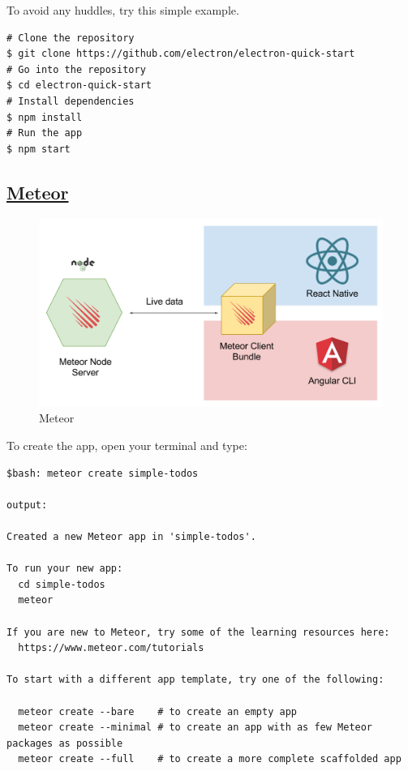 \documentclass[10pt, a4paper, twocolumn]{article}
\begin{document}
To avoid any huddles, try this simple example.

\begin{lstlisting}
# Clone the repository
$ git clone https://github.com/electron/electron-quick-start
# Go into the repository
$ cd electron-quick-start
# Install dependencies
$ npm install
# Run the app
$ npm start
\end{lstlisting}

\subsection{\href{https://www.meteor.com/install}{Meteor}}


\begin{figure}[h!]
	\includegraphics[width=\linewidth]{meteor.png} %
	\caption{Meteor} %
	\label{mtr} %
\end{figure}

To create the app, open your terminal and type:

\begin{lstlisting}
$bash: meteor create simple-todos

output:

Created a new Meteor app in 'simple-todos'.                                        

To run your new app:                          
  cd simple-todos                             
  meteor                                      
                                              
If you are new to Meteor, try some of the learning resources here:
  https://www.meteor.com/tutorials            
                                              
To start with a different app template, try one of the following:

  meteor create --bare    # to create an empty app
  meteor create --minimal # to create an app with as few Meteor packages as possible
  meteor create --full    # to create a more complete scaffolded app

\end{lstlisting}
\end{document}
